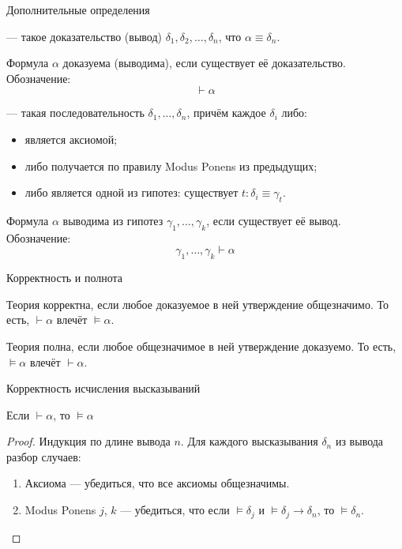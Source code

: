 \documentclass[aspectratio=169]{beamer}
\begin{document}
\begin{frame}{Дополнительные определения}

\begin{defrus} 
--- такое доказательство (вывод) $\delta_1, \delta_2, \dots, \delta_n$,
что $\alpha\equiv\delta_n$.

Формула $\alpha$ доказуема (выводима), если существует её доказательство. Обозначение:
$$\vdash \alpha$$\end{defrus}\pause

\begin{defrus}
--- такая последовательность
$\delta_1,\dots,\delta_n$, причём каждое $\delta_i$ либо:
\begin{itemize}
\item является аксиомой;
\item либо получается по правилу Modus Ponens из предыдущих;
\item либо является одной из гипотез: существует $t: \delta_i \equiv \gamma_t$.
\end{itemize}

Формула $\alpha$ выводима из гипотез $\gamma_1,\dots,\gamma_k$, если существует её вывод. Обозначение:
$$\gamma_1,\dots,\gamma_k\vdash\alpha$$\end{defrus}

\end{frame}

\begin{frame}{Корректность и полнота}
\begin{defrus}
Теория корректна, если любое доказуемое в ней утверждение общезначимо.
То есть, $\vdash\alpha$ влечёт $\models\alpha$.
\end{defrus}

\begin{defrus}
Теория полна, если любое общезначимое в ней утверждение доказуемо.
То есть, $\models\alpha$ влечёт $\vdash\alpha$.
\end{defrus}
\end{frame}

\begin{frame}{Корректность исчисления высказываний}
\begin{thmrus}[корректность]
Если $\vdash\alpha$, то $\models\alpha$
\end{thmrus}

\begin{proof}
Индукция по длине вывода $n$.
Для каждого высказывания $\delta_n$ из вывода разбор случаев:
\begin{enumerate}
\item Аксиома --- убедиться, что все аксиомы общезначимы.
\item Modus Ponens $j$, $k$ --- убедиться, что если $\models\delta_j$ и 
$\models\delta_j\rightarrow\delta_n$, то $\models\delta_n$.
\end{enumerate}
\end{proof}
\end{frame}
\end{document}
